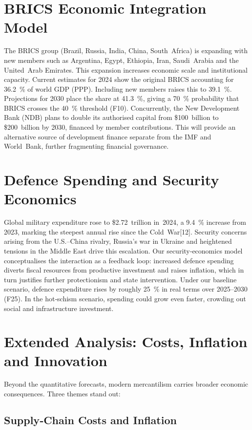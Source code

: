 \documentclass{article}
\begin{document}
\section{BRICS Economic Integration Model}

The BRICS group (Brazil, Russia, India, China, South Africa) is expanding with new members such as Argentina, Egypt, Ethiopia, Iran, Saudi Arabia and the United Arab Emirates.  This expansion increases economic scale and institutional capacity.  Current estimates for 2024 show the original BRICS accounting for 36.2 \% of world GDP (PPP).  Including new members raises this to 39.1 \%.  Projections for 2030 place the share at 41.3 \%, giving a 70 \% probability that BRICS crosses the 40 \% threshold (F10).  Concurrently, the New Development Bank (NDB) plans to double its authorised capital from \$100 billion to \$200 billion by 2030, financed by member contributions.  This will provide an alternative source of development finance separate from the IMF and World Bank, further fragmenting financial governance.

\section{Defence Spending and Security Economics}

Global military expenditure rose to \$2.72 trillion in 2024, a 9.4 \% increase from 2023, marking the steepest annual rise since the Cold War[12].  Security concerns arising from the U.S.–China rivalry, Russia’s war in Ukraine and heightened tensions in the Middle East drive this escalation.  Our security‑economics model conceptualises the interaction as a feedback loop: increased defence spending diverts fiscal resources from productive investment and raises inflation, which in turn justifies further protectionism and state intervention.  Under our baseline scenario, defence expenditure rises by roughly 25 \% in real terms over 2025–2030 (F25).  In the hot‑schism scenario, spending could grow even faster, crowding out social and infrastructure investment.

\section{Extended Analysis: Costs, Inflation and Innovation}

Beyond the quantitative forecasts, modern mercantilism carries broader economic consequences.  Three themes stand out:

\subsection{Supply‑Chain Costs and Inflation}
\end{document}
